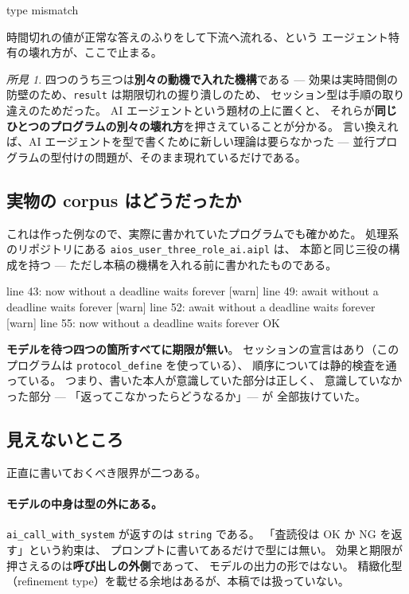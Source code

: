 \documentclass[11pt,a4paper]{ltjsarticle}
\theoremstyle{definition}
\theoremstyle{remark}
\newtheorem{finding}[theorem]{所見}
\begin{document}
\begin{term}
 type mismatch
\end{term}

時間切れの値が正常な答えのふりをして下流へ流れる、という
エージェント特有の壊れ方が、ここで止まる。

\begin{finding}
四つのうち三つは\textbf{別々の動機で入れた機構}である ---
効果は実時間側の防壁のため、\texttt{result} は期限切れの握り潰しのため、
セッション型は手順の取り違えのためだった。
AI エージェントという題材の上に置くと、
それらが\textbf{同じひとつのプログラムの別々の壊れ方}を押さえていることが分かる。
言い換えれば、AI エージェントを型で書くために新しい理論は要らなかった ---
並行プログラムの型付けの問題が、そのまま現れているだけである。
\end{finding}

\subsection{実物の corpus はどうだったか}

これは作った例なので、実際に書かれていたプログラムでも確かめた。
処理系のリポジトリにある \texttt{aios\_user\_three\_role\_ai.aipl} は、
本節と同じ三役の構成を持つ --- ただし本稿の機構を入れる前に書かれたものである。

\begin{term}
[warn] line 43: now without a deadline waits forever
[warn] line 49: await without a deadline waits forever
[warn] line 52: await without a deadline waits forever
[warn] line 55: now without a deadline waits forever
OK
\end{term}

\textbf{モデルを待つ四つの箇所すべてに期限が無い}。
セッションの宣言はあり（このプログラムは \texttt{protocol\_define} を使っている）、
順序については静的検査を通っている。
つまり、書いた本人が意識していた部分は正しく、
意識していなかった部分 --- 「返ってこなかったらどうなるか」--- が
全部抜けていた。

\subsection{見えないところ}

正直に書いておくべき限界が二つある。

\paragraph{モデルの中身は型の外にある。}
\texttt{ai\_call\_with\_system} が返すのは \texttt{string} である。
「査読役は OK か NG を返す」という約束は、
プロンプトに書いてあるだけで型には無い。
効果と期限が押さえるのは\textbf{呼び出しの外側}であって、
モデルの出力の形ではない。
精緻化型（refinement type）を載せる余地はあるが、本稿では扱っていない。
\end{document}
